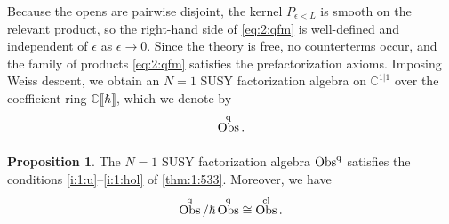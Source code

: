 \documentclass[final,reqno]{amsart}
\numberwithin{equation}{section}
\theoremstyle{definition}
\newtheorem{prp}[thm]{Proposition}
\newcommand{\ep}{\epsilon}
\newcommand{\bbC}{\mathbb{C}}
\newcommand{\dbr}[1]{\llbracket #1 \rrbracket} %
\newcommand{\cObs}[1]{\mathop{\Obs^{\textup{cl}}_{#1}}}
\newcommand{\qObs}[1]{\mathop{\Obs^{\textup{q}}_{#1}}}
\DeclareMathOperator{\Obs}{Obs}
\begin{document}
Because the opens are pairwise disjoint, 
the kernel $P_{\ep<L}$ is smooth on the relevant product, 
so the right-hand side of \eqref{eq:2:qfm} is well-defined 
and independent of $\ep$ as $\ep\to 0$. 
Since the theory is free, no counterterms occur, and the family of products
\eqref{eq:2:qfm} satisfies the prefactorization axioms. 
Imposing Weiss descent, 
we obtain an $N=1$ SUSY factorization algebra on $\bbC^{1|1}$
over the coefficient ring $\bbC\dbr{\hbar}$, which we denote by
\[
 \qObs{}.
\]

\begin{prp}\label{prp:2:qObsFA}
The $N=1$ SUSY factorization algebra $\qObs{}$
satisfies the conditions \ref{i:1:u}--\ref{i:1:hol} of \cref{thm:1:533}.
Moreover, we have 
\begin{align}\label{eq:2:qObs/h=cObs}
 \qObs{}/\hbar\qObs{} \cong \cObs{}.
\end{align}
\end{prp}
\end{document}
